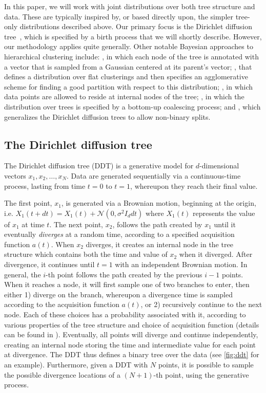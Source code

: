In this paper, we will work with joint distributions over both tree structure and data. These are typically inspired by, or based directly upon, the simpler tree-only distributions described above. Our primary focus is the Dirichlet diffusion tree~\cite{N03}, which is specified by a birth process that we will shortly describe. However, our methodology applies quite generally. Other notable Bayesian approaches to hierarchical clustering include: \cite{W00}, in which each node of the tree is annotated with a vector that is sampled from a Gaussian centered at its parent's vector; \cite{HG05}, that defines a distribution over flat clusterings and then specifies an agglomerative scheme for finding a good partition with respect to this distribution; \cite{AGJ08}, in which data points are allowed to reside at internal nodes of the tree; \cite{TDR08,BW12}, in which the distribution over trees is specified by a bottom-up coalescing process; and \cite{KG15}, which generalizes the Dirichlet diffusion trees to allow non-binary splits. 

\subsection{The Dirichlet diffusion tree}

The Dirichlet diffusion tree (DDT) is a 
generative model for $d$-dimensional vectors
$x_1, x_2, \ldots, x_N$. Data
are generated sequentially via a continuous-time
process, lasting from time $t = 0$ to $t = 1$,
whereupon they reach their final value.

The first point, $x_1$, is generated
via a Brownian motion, beginning at the origin, i.e.
$X_1(t + dt) = X_1(t) + \mathcal{N}(0, \sigma^2I_ddt)$
where $X_1(t)$ represents the value of $x_1$ at time $t$.
The next point, $x_2$, follows the path created
by $x_1$ until
it eventually \emph{diverges}
at a random time, according to a specified
acquisition function $a(t)$.
When $x_2$ diverges, it creates
an internal node in the tree structure
which contains both the time and value of $x_2$
when it diverged.
After divergence, it continues until $t = 1$ with 
an independent Brownian motion.
In general, the $i$-th point
follows the path created by the 
previous $i - 1$ points.
When it reaches a node, it
will first sample one of two branches
to enter, then
either 1) diverge on the branch,
whereupon a divergence time is sampled
according to the acquisition function $a(t)$,
or 2) recursively continue to the next node.
Each of these choices has a probability
associated with it, according to various properties
of the tree structure and choice of acquisition function
(details can be found in \cite{N03}).
Eventually, all points will diverge and continue independently,
creating an internal node storing the time and
intermediate value for each point at divergence.
The DDT thus defines a binary tree over the data
(see \autoref{fig:ddt} for an example).
Furthermore, given a DDT with $N$ points,
it is possible to sample the possible divergence
locations of a $(N + 1)$-th point, using
the generative process. 


